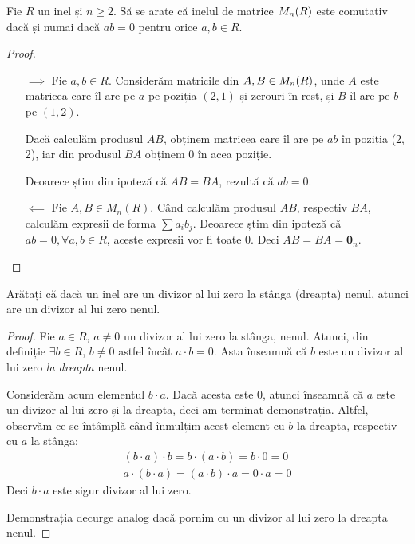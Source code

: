 \begin{exercise}[1.7]
Fie \(R\) un inel și \(n \geq 2\). Să se arate că inelul de matrice \(M_{n}({R})\) este comutativ dacă și numai dacă \(ab = 0\) pentru orice \(a, b \in R\).
\end{exercise}
\begin{proof}
\begin{itemize}
    \item[\(\implies\)] Fie \(a, b \in R\). Considerăm matricile din \(A, B \in M_{n}({R})\), unde \(A\) este matricea care îl are pe \(a\) pe poziția \((2, 1)\) și zerouri în rest, și \(B\) îl are pe \(b\) pe \((1, 2)\).
   
    Dacă calculăm produsul \(AB\), obținem matricea care îl are pe \(ab\) în poziția (2, 2), iar din produsul \(BA\) obținem 0 în acea poziție.
    
    Deoarece știm din ipoteză că \(AB = BA\), rezultă că \(ab = 0\).
    \item[\(\impliedby\)] Fie \(A, B \in M_n(R)\). Când calculăm produsul \(AB\), respectiv \(BA\), calculăm expresii de forma \(\sum a_i b_j\). Deoarece știm din ipoteză că \(ab = 0, \forall a, b \in R\), aceste expresii vor fi toate 0. Deci \(AB = BA = \symbf{0}_n\).
\end{itemize}
\end{proof}

\begin{exercise}[1.10]
Arătați că dacă un inel are un divizor al lui zero la stânga (dreapta) nenul, atunci are un divizor al lui zero nenul.
\end{exercise}
\begin{proof}
Fie \(a \in R\), \(a \neq 0\) un divizor al lui zero la stânga, nenul. Atunci, din definiție \(\exists b \in R\), \(b \neq 0\) astfel încât \(a \cdot b = 0\).
Asta înseamnă că \(b\) este un divizor al lui zero \emph{la dreapta} nenul.

Considerăm acum elementul \(b \cdot a\). Dacă acesta este 0, atunci înseamnă că \(a\) este un divizor al lui zero și la dreapta, deci am terminat demonstrația. Altfel, observăm ce se întâmplă când înmulțim acest element cu \(b\) la dreapta, respectiv cu \(a\) la stânga:
\begin{gather*}
    (b \cdot a) \cdot b = b \cdot (a \cdot b) = b \cdot 0 = 0 \\
    a \cdot (b \cdot a) = (a \cdot b) \cdot a = 0 \cdot a = 0
\end{gather*}
Deci \(b \cdot a\) este sigur divizor al lui zero.

Demonstrația decurge analog dacă pornim cu un divizor al lui zero la dreapta nenul.
\end{proof}

